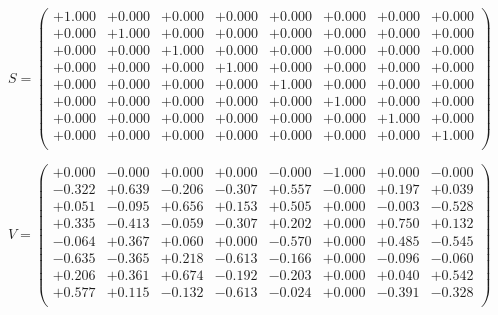\documentclass[9pt]{article}
\theoremstyle{plain}
\theoremstyle{definition}
\theoremstyle{remark}
\numberwithin{equation}{section}
\begin{document}
$S = \left(
\begin{array}{
cccccccc}
+1.000 & +0.000 & +0.000 & +0.000 & +0.000 & +0.000 & +0.000 & +0.000 \\
+0.000 & +1.000 & +0.000 & +0.000 & +0.000 & +0.000 & +0.000 & +0.000 \\
+0.000 & +0.000 & +1.000 & +0.000 & +0.000 & +0.000 & +0.000 & +0.000 \\
+0.000 & +0.000 & +0.000 & +1.000 & +0.000 & +0.000 & +0.000 & +0.000 \\
+0.000 & +0.000 & +0.000 & +0.000 & +1.000 & +0.000 & +0.000 & +0.000 \\
+0.000 & +0.000 & +0.000 & +0.000 & +0.000 & +1.000 & +0.000 & +0.000 \\
+0.000 & +0.000 & +0.000 & +0.000 & +0.000 & +0.000 & +1.000 & +0.000 \\
+0.000 & +0.000 & +0.000 & +0.000 & +0.000 & +0.000 & +0.000 & +1.000 \\
\end{array}
\right)$ \newline 

$V = \left(
\begin{array}{
cccccccc}
+0.000 & -0.000 & +0.000 & +0.000 & -0.000 & -1.000 & +0.000 & -0.000 \\
-0.322 & +0.639 & -0.206 & -0.307 & +0.557 & -0.000 & +0.197 & +0.039 \\
+0.051 & -0.095 & +0.656 & +0.153 & +0.505 & +0.000 & -0.003 & -0.528 \\
+0.335 & -0.413 & -0.059 & -0.307 & +0.202 & +0.000 & +0.750 & +0.132 \\
-0.064 & +0.367 & +0.060 & +0.000 & -0.570 & +0.000 & +0.485 & -0.545 \\
-0.635 & -0.365 & +0.218 & -0.613 & -0.166 & +0.000 & -0.096 & -0.060 \\
+0.206 & +0.361 & +0.674 & -0.192 & -0.203 & +0.000 & +0.040 & +0.542 \\
+0.577 & +0.115 & -0.132 & -0.613 & -0.024 & +0.000 & -0.391 & -0.328 \\
\end{array}
\right)$ \newline 
\end{document}
